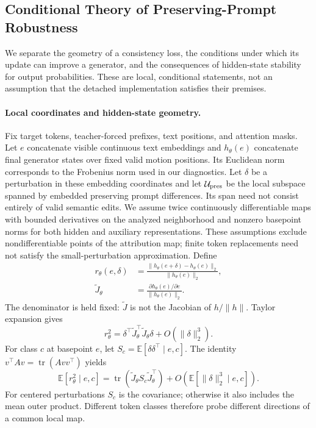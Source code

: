 \subsection{Conditional Theory of Preserving-Prompt Robustness}
\label{sec:robustness_theory}
We separate the geometry of a consistency loss, the conditions under which
its update can improve a generator, and the consequences of hidden-state
stability for output probabilities. These are local, conditional statements,
not an assumption that the detached implementation satisfies their premises.

\paragraph{Local coordinates and hidden-state geometry.}
Fix target tokens, teacher-forced prefixes, text positions, and attention
masks. Let $e$ concatenate visible continuous text embeddings and $h_\theta(e)$
concatenate final generator states over fixed valid motion positions. Its
Euclidean norm corresponds to the Frobenius norm used in our diagnostics.
Let $\delta$ be a perturbation in these embedding coordinates and let
$\mathcal U_{\rm pres}$ be the local subspace spanned by embedded preserving
prompt differences. Its span need not consist entirely of valid semantic
edits. We assume twice continuously differentiable maps with bounded
derivatives on the analyzed neighborhood and nonzero basepoint norms for
both hidden and auxiliary representations. These assumptions exclude
nondifferentiable points of the attribution map; finite token replacements
need not satisfy the small-perturbation approximation. Define
\begin{equation}
\begin{aligned}
 r_\theta(e,\delta)&=\frac{\|h_\theta(e+\delta)-h_\theta(e)\|_2}
 {\|h_\theta(e)\|_2},\\
 \widetilde J_\theta&=\frac{\partial h_\theta(e)/\partial e}{\|h_\theta(e)\|_2}.
\end{aligned}
\label{eq:theory_relative_jacobian}
\end{equation}
The denominator is held fixed: $\widetilde J$ is not the Jacobian of
$h/\|h\|$. Taylor expansion gives
\begin{equation}
 r_\theta^2=\delta^\top\widetilde J_\theta^\top\widetilde J_\theta\delta
 +O(\|\delta\|_2^3).
\label{eq:theory_local_response}
\end{equation}
For class $c$ at basepoint $e$, let $S_c=\mathbb E[\delta\delta^\top\mid e,c]$.
The identity $v^\top Av=\operatorname{tr}(Avv^\top)$ yields
\begin{equation}
 \mathbb E[r_\theta^2\mid e,c]
 =\operatorname{tr}(\widetilde J_\theta S_c\widetilde J_\theta^\top)
 +O(\mathbb E[\|\delta\|_2^3\mid e,c]).
\label{eq:theory_trace}
\end{equation}
For centered perturbations $S_c$ is the covariance; otherwise it also
includes the mean outer product. Different token classes therefore probe
different directions of a common local map.

